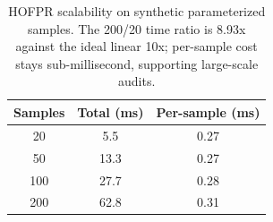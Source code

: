 \begin{table}[t]
\centering
\small
\begin{tabular}{ccc}
\toprule
Samples & Total (ms) & Per-sample (ms) \\
\midrule
  20 & 5.5 & 0.27 \\
  50 & 13.3 & 0.27 \\
  100 & 27.7 & 0.28 \\
  200 & 62.8 & 0.31 \\
\bottomrule
\end{tabular}
\caption{HOFPR scalability on synthetic parameterized samples. The
200/20 time ratio is 8.93x against the ideal linear 10x; per-sample
cost stays sub-millisecond, supporting large-scale audits.}
\label{tab:scalability}
\end{table}
